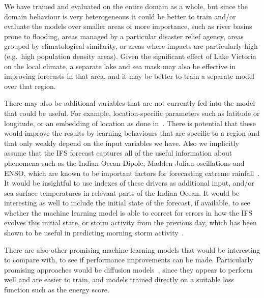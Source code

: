 \documentclass{article}
\begin{document}
We have trained and evaluated on the entire domain as a whole, but since the domain behaviour is very heterogeneous it could be better to train and/or evaluate the models over smaller areas of more importance, such as river basins prone to flooding, areas managed by a particular disaster relief agency, areas grouped by climatological similarity, or areas where impacts are particularly high (e.g.~high population density areas). Given the significant effect of Lake Victoria on the local climate, a separate lake and sea mask may also be effective in improving forecasts in that area, and it may be better to train a separate model over that region.



There may also be additional variables that are not currently fed into the model that could be useful. For example, location-specific parameters such as latitude or longitude, or an embedding of location as done in~\cite{rasp_neural_2018}. There is potential that these would improve the results by learning behaviours that are specific to a region and that only weakly depend on the input variables we have. Also we implicitly assume that the IFS forecast captures all of the useful information about phenomena such as the Indian Ocean Dipole, Madden-Julian oscillations and ENSO, which are known to be important factors for forecasting extreme rainfall~\citep{wainwright_extreme_2021, palmer_drivers_2023}. It would be insightful to use indexes of these drivers as additional input, and/or sea surface temperatures in relevant parts of the Indian Ocean. It would be interesting as well to include the initial state of the forecast, if available, to see whether the machine learning model is able to correct for errors in how the IFS evolves this initial state, or storm activity from the previous day, which has been shown to be useful in predicting morning storm activity~\citep{thiery_early_2017}. 

There are also other promising machine learning models that would be interesting to compare with, to see if performance improvements can be made. Particularly promising approaches would be diffusion models~\citep{addison_machine_2022, leinonen_latent_2023}, since they appear to perform well and are easier to train, and models trained directly on a suitable loss function such as the energy score.
\end{document}
